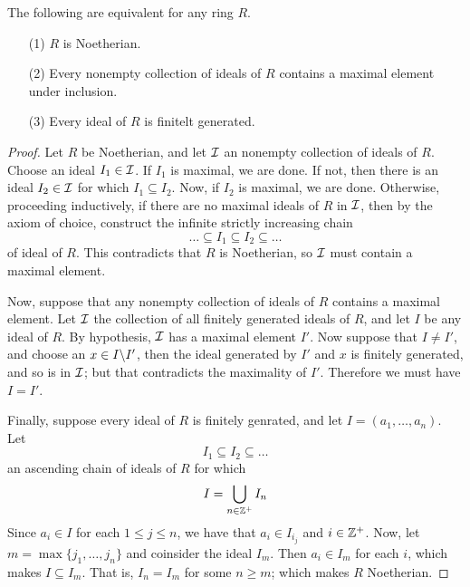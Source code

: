 \begin{theorem}\label{1.1.2}
    The following are equivalent for any ring $R$.
    \begin{enumerate}
        \item[(1)] $R$ is Noetherian.

        \item[(2)] Every nonempty collection of ideals of $R$ contains a maximal
            element under inclusion.

        \item[(3)] Every ideal of $R$ is finitelt generated.
    \end{enumerate}
\end{theorem}
\begin{proof}
    Let $R$ be Noetherian, and let  $\mathcal{I}$ an nonempty collection of ideals of
    $R$. Choose an ideal  $I_1 \in \mathcal{I}$. If $I_1$ is maximal, we are done. If
    not, then there is an ideal $I_2 \in \mathcal{I}$ for which  $I_1 \subseteq I_2$.
    Now, if $I_2$ is maximal, we are done. Otherwise, proceeding inductively, if
    there are no maximal ideals of $R$ in $\mathcal{I}$, then by the axiom of choice,
    construct the infinite strictly increasing chain
    \begin{equation*}
         \dots \subseteq I_1 \subseteq I_2 \subseteq \dots
    \end{equation*}
    of ideal of $R$. This contradicts that  $R$ is Noetherian, so  $\mathcal{I}$ must
    contain a maximal element.

    Now, suppose that any nonempty collection of ideals of  $R$ contains
    a maximal element. Let  $\mathcal{I}$ the collection of all finitely generated
    ideals of $R$, and let $I$ be any ideal of  $R$. By hypothesis, $\mathcal{I}$ has a
    maximal element  $I'$. Now suppose that $I \neq I'$, and choose an
    $x \in I \backslash I'$, then the ideal generated by $I'$ and  $x$ is finitely
    generated, and so is in  $\mathcal{I}$; but that contradicts the maximality of  $I'$.
    Therefore we must have  $I=I'$.

    Finally, suppose every ideal of $R$ is finitely genrated, and let
    $I=(a_1, \dots, a_n)$. Let
    \begin{equation*}
        I_1 \subseteq I_2 \subseteq \dots
    \end{equation*}
    an ascending chain of ideals of $R$ for which
    \begin{equation*}
        I=\bigcup_{n \in \mathbb{Z}^+}{I_n}
    \end{equation*}
    Since $a_i \in I$ for each  $1 \leq j \leq n$, we have that  $a_i \in
    I_{i_j}$ and $i \in \mathbb{Z}^+$. Now, let  $m=\max{\{j_1, \dots, j_n\}}$ and
    coinsider the ideal $I_m$. Then  $a_i \in I_m$ for each $i$, which makes $I
    \subseteq I_m$. That is,  $I_n=I_m$ for some  $n \geq m$; which makes  $R$
    Noetherian.
\end{proof}

